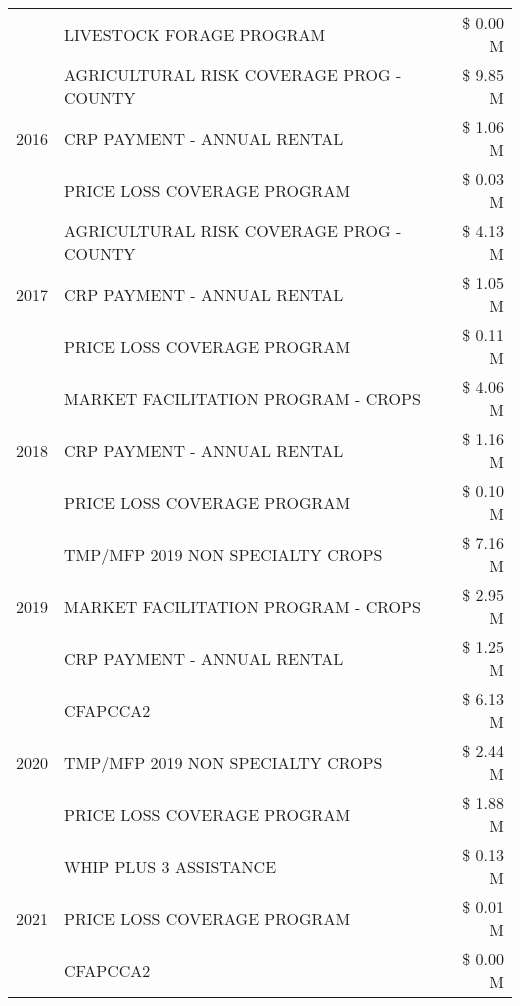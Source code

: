 \begin{tabular}{llr}
 & LIVESTOCK FORAGE PROGRAM & \$ 0.00 M \\
\cline{1-3}
\multirow[t]{3}{*}{2016} & AGRICULTURAL RISK COVERAGE PROG - COUNTY      & \$ 9.85 M \\
 & CRP PAYMENT - ANNUAL RENTAL                   & \$ 1.06 M \\
 & PRICE LOSS COVERAGE PROGRAM                   & \$ 0.03 M \\
\cline{1-3}
\multirow[t]{3}{*}{2017} & AGRICULTURAL RISK COVERAGE PROG - COUNTY & \$ 4.13 M \\
 & CRP PAYMENT - ANNUAL RENTAL & \$ 1.05 M \\
 & PRICE LOSS COVERAGE PROGRAM & \$ 0.11 M \\
\cline{1-3}
\multirow[t]{3}{*}{2018} & MARKET FACILITATION PROGRAM - CROPS & \$ 4.06 M \\
 & CRP PAYMENT - ANNUAL RENTAL & \$ 1.16 M \\
 & PRICE LOSS COVERAGE PROGRAM & \$ 0.10 M \\
\cline{1-3}
\multirow[t]{3}{*}{2019} & TMP/MFP 2019 NON SPECIALTY CROPS & \$ 7.16 M \\
 & MARKET FACILITATION PROGRAM - CROPS & \$ 2.95 M \\
 & CRP PAYMENT - ANNUAL RENTAL & \$ 1.25 M \\
\cline{1-3}
\multirow[t]{3}{*}{2020} & CFAPCCA2 & \$ 6.13 M \\
 & TMP/MFP 2019 NON SPECIALTY CROPS & \$ 2.44 M \\
 & PRICE LOSS COVERAGE PROGRAM & \$ 1.88 M \\
\cline{1-3}
\multirow[t]{3}{*}{2021} & WHIP PLUS 3 ASSISTANCE & \$ 0.13 M \\
 & PRICE LOSS COVERAGE PROGRAM & \$ 0.01 M \\
 & CFAPCCA2 & \$ 0.00 M \\
\cline{1-3}
\bottomrule
\end{tabular}
